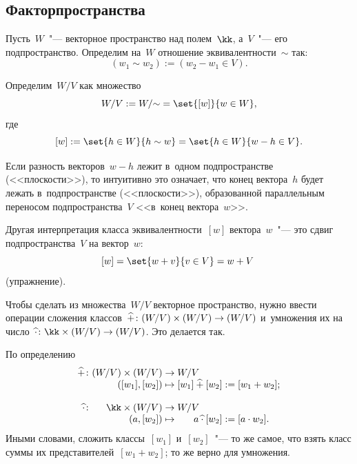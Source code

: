	\subsection{Факторпространства}
	\begin{definition}
		Пусть~$W$~"--- векторное пространство над полем~$\kk$, а~$V$~"--- его
		подпространство. Определим на~$W$ отношение эквивалентности~$\sim$ так:
		\[
			(w_1 \sim w_2) :=
			(w_2 - w_1 \in V).
		\]

		Определим~$W/V$ как множество
		\[
			W/V := W/{\sim} =
			\set{[w]}{w \in W},
		\]
		где
		\[
			[w] := \set{h \in W}{h \sim w} = \set{h \in W}{w - h \in V}
			.
		\]

		Если разность векторов~$w - h$ лежит в~одном подпространстве
		(<<плоскости>>), то интуитивно это означает, что конец вектора~$h$
		будет лежать в~подпространстве (<<плоскости>>), образованной
		параллельным переносом подпространства~$V$ <<в~конец вектора~$w$>>.

		Другая интерпретация класса эквивалентности~$[w]$ вектора~$w$~"--- это
			сдвиг подпространства~$V$ на вектор~$w$:
		\[
			[w] = \set{w + v}{v \in V} = w + V~\]
		(упражнение).
		\label{<+label+>}
	\end{definition}


	Чтобы сделать из множества~$W/V$ векторное пространство, нужно ввести
	операции сложения классов~$\mathbin{\widehat{+}} \colon (W/V) \times (W/V) \to (W/V)$
	и~умножения их на число~$\mhc \colon \kk \times (W/V) \to (W/V)$. Это
	делается так.

	\begin{definition}
		По определению
		\[
			\begin{array}{r@{}r@{}c@{}r@{}c@{}l}
				\mhp
				\colon
				{}
				&
				(W/V) \times (W/V)
				&
				{} \to {}
				&
				\multicolumn{1}{@{}l@{}}{W/V}
				&&
				\\
				&
				([w_1], [w_2])
				&
				{} \mapsto {} 
				&
				[w_1] \mhp [w_2]
				&
				{} := {}
				&
				[w_1 + w_2];
				\\
				\\
				\mhc
				\colon
				{}
				&
				\kk \times (W/V) 
				&
				{} \to {}
				&
				\multicolumn{1}{@{}l@{}}{W/V}
				&&
				\\
				&
				(a, [w_2])
				&
				{} \mapsto {}
				&
				a \mhc [w_2]
				&
				{} := {}
				&
				[a \cdot w_2].
			\end{array}
		\]
		Иными словами, сложить классы~$[w_1]$ и~$[w_2]$~"--- то же самое, что
		взять класс суммы их представителей~$[w_1 + w_2]$; то же верно для
		умножения.
	\end{definition}

